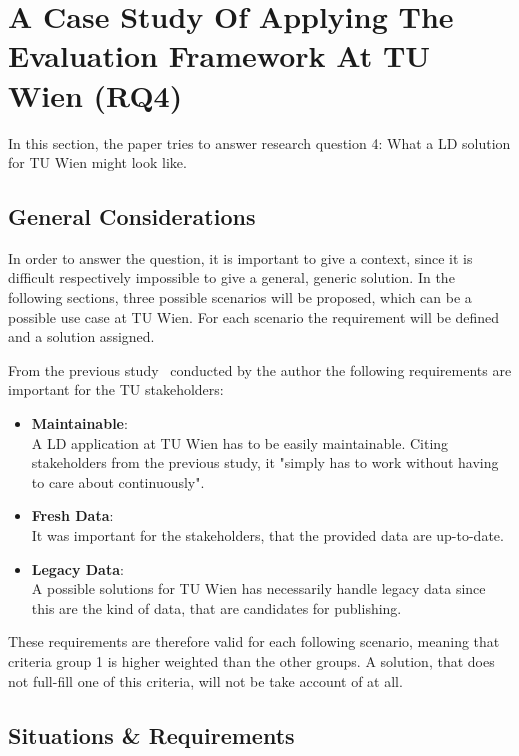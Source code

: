 \chapter{A Case Study Of Applying The Evaluation Framework At TU Wien (RQ4)}\label{ch:tuwien}

In this section, the paper tries to answer research question 4: What a LD solution for TU Wien might look like.

\section{General Considerations}
In order to answer the question, it is important to give a context, since it is difficult respectively impossible to give a general, generic solution. In the following sections, three possible scenarios will be proposed, which can be a possible use case at TU Wien. For each scenario the requirement will be defined and a solution assigned.

From the previous study~\cite{baronyai_publishing_2016} conducted by the author the following requirements are important for the TU stakeholders:

\begin{itemize}

\item \textbf{Maintainable}: \\
A LD application at TU Wien has to be easily maintainable. Citing stakeholders from the previous study, it "simply has to work without having to care about continuously".

\item \textbf{Fresh Data}: \\
It was important for the stakeholders, that the provided data are up-to-date.

\item \textbf{Legacy Data}: \\
A possible solutions for TU Wien has necessarily handle legacy data since this are the kind of data, that are candidates for publishing.

\end{itemize}

These requirements are therefore valid for each following scenario, meaning that criteria group 1 is higher weighted than the other groups. A solution, that does not full-fill one of this criteria, will not be take account of at all.

\section{Situations \& Requirements}

